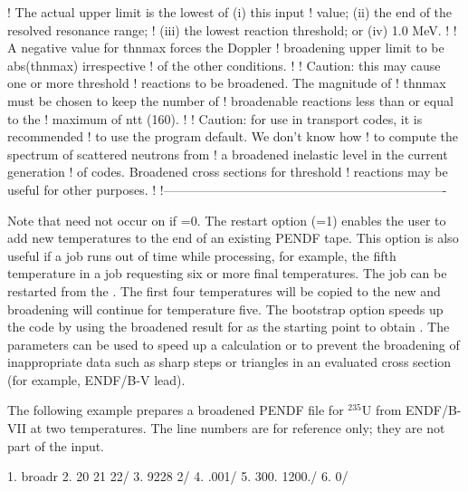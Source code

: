 \begin{ccode}
   !            The actual upper limit is the lowest of (i) this input
   !            value; (ii) the end of the resolved resonance range;
   !            (iii) the lowest reaction threshold; or (iv) 1.0 MeV.
   !
   !            A negative value for thnmax forces the Doppler
   !            broadening upper limit to be abs(thnmax) irrespective
   !            of the other conditions.
   !
   !            Caution:  this may cause one or more threshold
   !            reactions to be broadened.  The magnitude of
   !            thnmax must be chosen to keep the number of
   !            broadenable reactions less than or equal to the
   !            maximum of ntt (160).
   !
   !            Caution: for use in transport codes, it is recommended
   !            to use the program default.  We don't know how
   !            to compute the spectrum of scattered neutrons from
   !            a broadened inelastic level in the current generation
   !            of codes.  Broadened cross sections for threshold
   !            reactions may be useful for other purposes.
   !
   !-------------------------------------------------------------------

\end{ccode}
\normalsize

Note that  need not occur on  if
=0.  The restart option
(=1) enables the user to add new temperatures
to the end of an existing PENDF tape.  This
option is also useful if a job runs out of time while
processing, for example, the fifth temperature in a job requesting
six or more final temperatures.  The job can be
restarted from the .  The first four temperatures
will be copied to the new  and broadening will
continue for temperature five.  The bootstrap
option speeds up the code by using the broadened result for
 as the starting point to obtain .
The  parameters can be used to speed up a calculation
or to prevent the broadening of inappropriate data such as sharp
steps or triangles in an evaluated cross section (for example,
ENDF/B-V lead).

The following example prepares a broadened PENDF file for
$^{235}$U from ENDF/B-VII at two temperatures.
The line numbers are for reference only; they are not part
of the input.
\small
\begin{ccode}

   1.  broadr
   2.  20 21 22/
   3.  9228 2/
   4.  .001/
   5.  300. 1200./
   6.  0/

\end{ccode}
\normalsize

